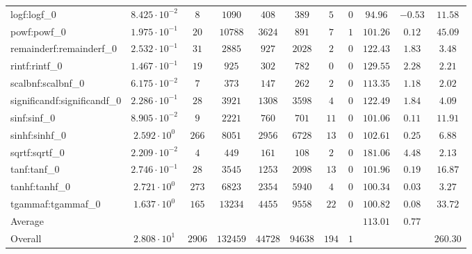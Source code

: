 \begin{tabular}{|l|c|c|c|c|c|c|c|c|c|c|}
logf:logf\_0                 & $ 8.425 \cdot 10^{-2} $ & $ 8      $ & $ 1090   $ & $ 408   $ & $ 389   $ & $ 5   $ & $ 0 $ & $ 94.96       $ & $ -0.53   $ & $ 11.58   $ \\
powf:powf\_0                 & $ 1.975 \cdot 10^{-1} $ & $ 20     $ & $ 10788  $ & $ 3624  $ & $ 891   $ & $ 7   $ & $ 1 $ & $ 101.26      $ & $ 0.12    $ & $ 45.09   $ \\
remainderf:remainderf\_0     & $ 2.532 \cdot 10^{-1} $ & $ 31     $ & $ 2885   $ & $ 927   $ & $ 2028  $ & $ 2   $ & $ 0 $ & $ 122.43      $ & $ 1.83    $ & $ 3.48    $ \\
rintf:rintf\_0               & $ 1.467 \cdot 10^{-1} $ & $ 19     $ & $ 925    $ & $ 302   $ & $ 782   $ & $ 0   $ & $ 0 $ & $ 129.55      $ & $ 2.28    $ & $ 2.21    $ \\
scalbnf:scalbnf\_0           & $ 6.175 \cdot 10^{-2} $ & $ 7      $ & $ 373    $ & $ 147   $ & $ 262   $ & $ 2   $ & $ 0 $ & $ 113.35      $ & $ 1.18    $ & $ 2.02    $ \\
significandf:significandf\_0 & $ 2.286 \cdot 10^{-1} $ & $ 28     $ & $ 3921   $ & $ 1308  $ & $ 3598  $ & $ 4   $ & $ 0 $ & $ 122.49      $ & $ 1.84    $ & $ 4.09    $ \\
sinf:sinf\_0                 & $ 8.905 \cdot 10^{-2} $ & $ 9      $ & $ 2221   $ & $ 760   $ & $ 701   $ & $ 11  $ & $ 0 $ & $ 101.06      $ & $ 0.11    $ & $ 11.91   $ \\
sinhf:sinhf\_0               & $ 2.592 \cdot 10^{0}  $ & $ 266    $ & $ 8051   $ & $ 2956  $ & $ 6728  $ & $ 13  $ & $ 0 $ & $ 102.61      $ & $ 0.25    $ & $ 6.88    $ \\
sqrtf:sqrtf\_0               & $ 2.209 \cdot 10^{-2} $ & $ 4      $ & $ 449    $ & $ 161   $ & $ 108   $ & $ 2   $ & $ 0 $ & $ 181.06      $ & $ 4.48    $ & $ 2.13    $ \\
tanf:tanf\_0                 & $ 2.746 \cdot 10^{-1} $ & $ 28     $ & $ 3545   $ & $ 1253  $ & $ 2098  $ & $ 13  $ & $ 0 $ & $ 101.96      $ & $ 0.19    $ & $ 16.87   $ \\
tanhf:tanhf\_0               & $ 2.721 \cdot 10^{0}  $ & $ 273    $ & $ 6823   $ & $ 2354  $ & $ 5940  $ & $ 4   $ & $ 0 $ & $ 100.34      $ & $ 0.03    $ & $ 3.27    $ \\
tgammaf:tgammaf\_0           & $ 1.637 \cdot 10^{0}  $ & $ 165    $ & $ 13234  $ & $ 4455  $ & $ 9558  $ & $ 22  $ & $ 0 $ & $ 100.82      $ & $ 0.08    $ & $ 33.72   $ \\
\hline
Average                      & $                     $ & $        $ & $        $ & $       $ & $       $ & $     $ & $   $ & $ 113.01      $ & $ 0.77    $ & $         $ \\
\hline
Overall                      & $ 2.808 \cdot 10^{1}  $ & $ 2906   $ & $ 132459 $ & $ 44728 $ & $ 94638 $ & $ 194 $ & $ 1 $ & $             $ & $         $ & $ 260.30  $ \\
\hline
\end{tabular}
